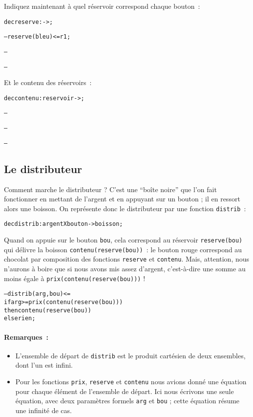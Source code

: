 Indiquez maintenant à quel réservoir correspond chaque bouton~:
\begin{alltt}
dec reserve : 		 -> 		;

--- reserve (bleu)  	<= 	r1;

---

---
\end{alltt}

Et le contenu des réservoirs~:
\begin{alltt}
dec contenu : 	reservoir -> 		;

---

---

---
\end{alltt}

\subsection{Le distributeur}

Comment marche le distributeur ? C'est une ``boîte noire'' que l'on
fait fonctionner en mettant de l'argent et en appuyant sur un bouton ;
il en ressort alors une boisson. On représente donc le distributeur
par une fonction \texttt{distrib}~:
\begin{alltt}
dec distrib : 	argent X bouton	->	boisson ;
\end{alltt}
Quand on appuie sur le bouton \texttt{bou}, cela correspond au
réservoir \texttt{reserve(bou)} qui délivre la boisson
\texttt{contenu(reserve(bou))}~: le bouton rouge correspond au
chocolat par composition des fonctions \texttt{reserve} et
\texttt{contenu}. Mais, attention, nous n'aurons à boire que si nous
avons mis assez d'argent, c'est-à-dire une somme au moins égale à
\texttt{prix(contenu(reserve(bou)))} !
\begin{alltt}
--- distrib ( arg , bou ) <= 
          if  arg >= prix(contenu(reserve(bou)))
              then contenu(reserve(bou))
              else rien ;
\end{alltt}

\paragraph{Remarques~: }
\begin{itemize}
\item L'ensemble de départ de \texttt{distrib} est 
le produit cartésien de deux ensembles, dont l'un est infini.

\item Pour les fonctions \texttt{prix}, 
\texttt{reserve} et \texttt{contenu} nous avions 
donné une équation pour chaque élément de l'ensemble de départ. Ici
nous écrivons une seule équation, avec deux paramètres formels \texttt{arg}
et \texttt{bou} ; cette équation résume une infinité de cas.

\end{itemize}


